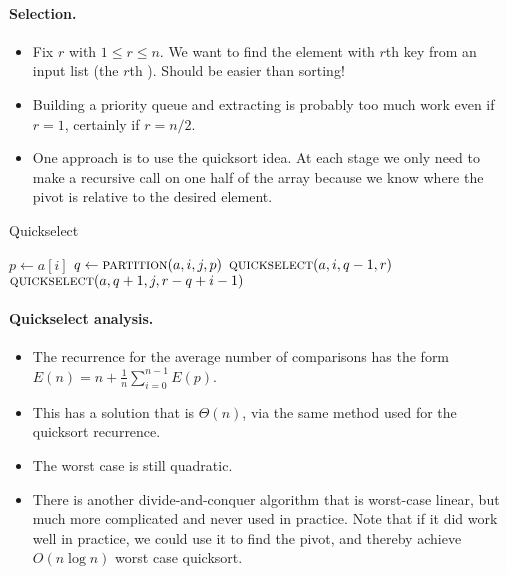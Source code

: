 \paragraph{Selection.}
\begin{itemize}
\item Fix $r$ with $1\leq r \leq n$. We want to find the element with
$r$th key from an input list (the $r$th ). 
Should be easier than sorting! 
\item
Building a priority queue and extracting is probably too much work even if 
$r = 1$, certainly if $r = n/2$. 
\item One approach is to use the quicksort idea. At each stage we only need to 
make a recursive call on one half of the array because we know where the pivot 
is relative to the desired element. 
\end{itemize}

\begin{algorithm}[H]
  \caption{Quickselect
     \label{alg:quickselect}}
\begin{algorithmic}[0]
		\State $p \gets a[i]$ 
		\State $q \gets  \Call{partition}{a, i,j,p}$ 
			\State {}
			\State $\Call{quickselect}{a,i,q-1,r}$ 
		\Else{}
			\State $\Call{quickselect}{a,q+1,j,r-q+i-1}$ 
		\EndIf
	\EndIf
\EndFunction  
\end{algorithmic}
\end{algorithm}


\paragraph{Quickselect analysis.}
\begin{itemize}
\item The recurrence for the average number of comparisons has the form 
$E(n) = n + \frac{1}{n} \sum_{i=0}^{n-1} E(p)$. 
\item This has a solution that is 
$\Theta(n)$, via the same method used for the quicksort recurrence.
\item The worst case is still quadratic.
\item There is another divide-and-conquer 
algorithm that is worst-case linear, but much more complicated and never used in practice. Note that if it did work well in practice, we could use it to find the pivot, and thereby achieve $O(n\log n)$ worst case quicksort.
\end{itemize}

